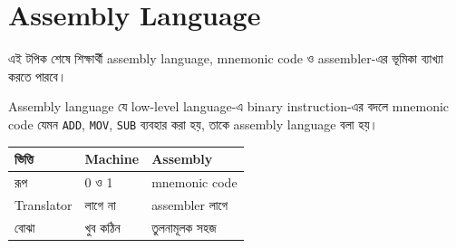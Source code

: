 \section{Assembly Language}

\begin{learningbox}
এই টপিক শেষে শিক্ষার্থী assembly language, mnemonic code ও assembler-এর ভূমিকা ব্যাখ্যা করতে পারবে।
\end{learningbox}

\begin{definitionbox}{Assembly language}
যে low-level language-এ binary instruction-এর বদলে mnemonic code যেমন \texttt{ADD}, \texttt{MOV}, \texttt{SUB} ব্যবহার করা হয়, তাকে assembly language বলা হয়।
\end{definitionbox}

\begin{center}
\end{center}

\begin{center}
\begin{tabular}{|p{}|p{}|p{}|}
\hline
\textbf{ভিত্তি} & \textbf{Machine} & \textbf{Assembly} \\
\hline
রূপ & 0 ও 1 & mnemonic code \\
\hline
Translator & লাগে না & assembler লাগে \\
\hline
বোঝা & খুব কঠিন & তুলনামূলক সহজ \\
\hline
\end{tabular}
\end{center}
